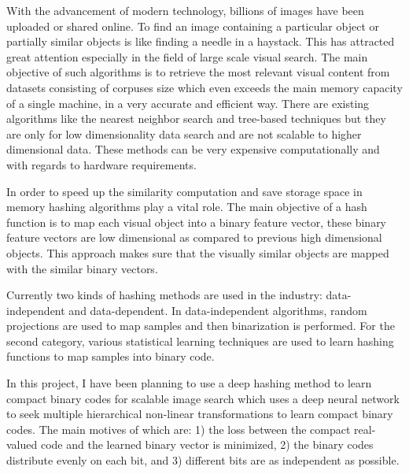 \documentclass[12pt, a4paper,twoside]{article}
\begin{document}
\label{sec:introduction}
With the advancement of modern technology, billions of images have been uploaded or shared online. To find an image containing a particular object or partially 
similar objects is like finding a needle in a haystack. This has attracted great attention especially in the field of large scale visual search. The main objective of such algorithms is to retrieve the most relevant visual content from 
datasets consisting of corpuses size which even exceeds the main memory capacity of a single machine, in a very accurate and efficient way.
There are existing algorithms like the nearest neighbor search and tree-based techniques but they are only for low dimensionality data search and are 
not scalable to higher dimensional data. These methods can be very expensive computationally and with regards to hardware requirements.

In order to speed up the similarity computation and save storage space in memory hashing algorithms play a vital role. The main objective of a 
hash function is to map each visual object into a binary feature vector, these binary feature vectors are low dimensional as compared to previous 
high dimensional objects. This approach makes sure that the visually similar objects are mapped with the similar binary vectors.

Currently two kinds of hashing methods are used in the industry: data-independent and data-dependent. In data-independent algorithms, random 
projections are used to map samples and then binarization is performed. For the second category, various statistical learning techniques are used to learn hashing functions to map samples into binary code.

In this project, I have been planning to use a deep hashing method \cite{DeepHashing} to learn compact binary codes for scalable image search which uses a deep neural network to seek multiple hierarchical non-linear transformations to learn compact binary codes. The main motives of which are:
1) the loss between the compact real-valued code and the learned binary vector is minimized, 2) the binary codes distribute evenly on
each bit, and 3) different bits are as independent as possible.
\end{document}
